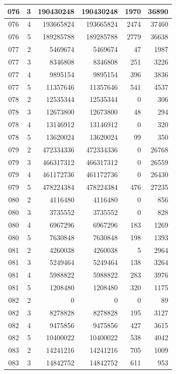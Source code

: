 \begin{longtable}{|c|r|r|r|r|r|}
\hline
076 & 3 & 190430248 & 190430248 & 1970 & 36890 \\
\hline
076 & 4 & 193665824 & 193665824 & 2474 & 37460 \\
\hline
076 & 5 & 189285788 & 189285788 & 2779 & 36638 \\
\hline
077 & 2 & 5469674 & 5469674 & 47 & 1987 \\
\hline
077 & 3 & 8346808 & 8346808 & 251 & 3226 \\
\hline
077 & 4 & 9895154 & 9895154 & 396 & 3836 \\
\hline
077 & 5 & 11357646 & 11357646 & 541 & 4537 \\
\hline
078 & 2 & 12535344 & 12535344 & 0 & 306 \\
\hline
078 & 3 & 12673800 & 12673800 & 48 & 294 \\
\hline
078 & 4 & 13146912 & 13146912 & 0 & 320 \\
\hline
078 & 5 & 13620024 & 13620024 & 99 & 350 \\
\hline
079 & 2 & 472334336 & 472334336 & 0 & 26768 \\
\hline
079 & 3 & 466317312 & 466317312 & 0 & 26559 \\
\hline
079 & 4 & 461172736 & 461172736 & 0 & 26430 \\
\hline
079 & 5 & 478224384 & 478224384 & 476 & 27235 \\
\hline
080 & 2 & 4116480 & 4116480 & 0 & 856 \\
\hline
080 & 3 & 3735552 & 3735552 & 0 & 828 \\
\hline
080 & 4 & 6967296 & 6967296 & 183 & 1269 \\
\hline
080 & 5 & 7630848 & 7630848 & 198 & 1393 \\
\hline
081 & 2 & 4260038 & 4260038 & 5 & 2964 \\
\hline
081 & 3 & 5249464 & 5249464 & 138 & 3264 \\
\hline
081 & 4 & 5988822 & 5988822 & 283 & 3976 \\
\hline
081 & 5 & 1208480 & 1208480 & 320 & 1175 \\
\hline
082 & 2 & 0 & 0 & 0 & 89 \\
\hline
082 & 3 & 8278828 & 8278828 & 195 & 3127 \\
\hline
082 & 4 & 9475856 & 9475856 & 427 & 3615 \\
\hline
082 & 5 & 10400022 & 10400022 & 538 & 4042 \\
\hline
083 & 2 & 14241216 & 14241216 & 705 & 1009 \\
\hline
083 & 3 & 14842752 & 14842752 & 611 & 953 \\

\end{longtable}
